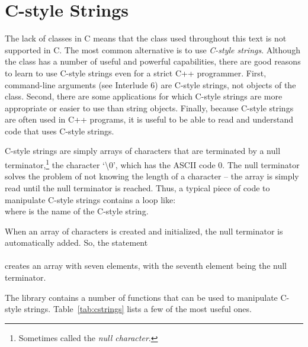 \section{C-style Strings}

The lack of classes in C means that the  class used throughout this text is not supported in C.  The most common alternative is to use \emph{C-style strings}.  Although the  class has a number of useful and powerful capabilities, there are good reasons to learn to use C-style strings even for a strict C++ programmer.   First, command-line arguments (see Interlude 6) are C-style strings, not objects of the  class.  Second, there are some applications for which C-style strings are more appropriate or easier to use than string objects.  Finally, because C-style strings are often used in C++ programs, it is useful to be able to read and understand code that uses C-style strings.

C-style strings are simply arrays of characters that are terminated by a null terminator,\footnote{Sometimes called the \emph{null character}.} the character `\textbackslash 0', which has the ASCII code 0.  The null terminator solves the problem of not knowing the length of a character -- the array is simply read until the null terminator is reached.  Thus, a typical piece of code to manipulate C-style strings contains a loop like:\\
where  is the name of the C-style string.

When an array of characters is created and initialized, the null terminator is automatically added.  So, the statement\\
\\
creates an array with seven elements, with the seventh element being the null terminator.

The  library contains a number of functions that can be used to manipulate C-style strings.  Table~\ref{tab:cstrings} lists a few of the most useful ones.

